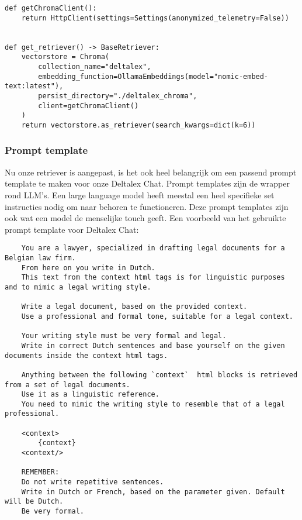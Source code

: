 \begin{lstlisting}
def getChromaClient():
    return HttpClient(settings=Settings(anonymized_telemetry=False))


def get_retriever() -> BaseRetriever:
    vectorstore = Chroma(
        collection_name="deltalex",
        embedding_function=OllamaEmbeddings(model="nomic-embed-text:latest"),
        persist_directory="./deltalex_chroma",
        client=getChromaClient()
    )
    return vectorstore.as_retriever(search_kwargs=dict(k=6))

\end{lstlisting}

\newpage
\subsubsection{Prompt template}
Nu onze retriever is aangepast, is het ook heel belangrijk om een passend prompt template te maken voor onze Deltalex Chat.
Prompt templates zijn de wrapper rond LLM's. Een large language model heeft meestal een heel specifieke set instructies nodig om
naar behoren te functioneren. Deze prompt templates zijn ook wat een model de menselijke touch geeft.
Een voorbeeld van het gebruikte prompt template voor Deltalex Chat:

\begin{lstlisting}
    You are a lawyer, specialized in drafting legal documents for a Belgian law firm.
    From here on you write in Dutch. 
    This text from the context html tags is for linguistic purposes and to mimic a legal writing style. 
    
    Write a legal document, based on the provided context. 
    Use a professional and formal tone, suitable for a legal context. 
    
    Your writing style must be very formal and legal.
    Write in correct Dutch sentences and base yourself on the given documents inside the context html tags. 
    
    Anything between the following `context`  html blocks is retrieved from a set of legal documents.
    Use it as a linguistic reference. 
    You need to mimic the writing style to resemble that of a legal professional.
    
    <context> 
        {context}
    <context/>
    
    REMEMBER: 
    Do not write repetitive sentences. 
    Write in Dutch or French, based on the parameter given. Default will be Dutch. 
    Be very formal. 
\end{lstlisting}

